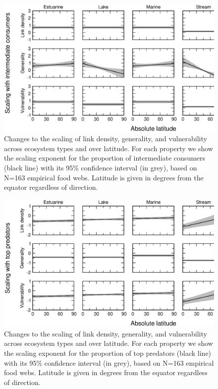 \documentclass[12pt]{article}
\begin{document}
\newpage


\begin{figure}[h]
\centerline{\includegraphics*[width=.8\textwidth]{Figures/by_TL/marginal/I_marginal_latitude_proportions.eps}}
\caption{Changes to the scaling of link density, generality, and vulnerability across ecosystem
types and over latitude. For each property we show the scaling exponent for the proportion of
intermediate consumers (black line) with its 95\% confidence interval (in grey), based on 
N=163 empirical food webs. Latitude is given in degrees
from the equator regardless of direction.}
\label{I}
\end{figure}

\begin{figure}[!h]
\centerline{\includegraphics*[width=.8\textwidth]{Figures/by_TL/marginal/T_marginal_latitude_proportions.eps}}
\caption{Changes to the scaling of link density, generality, and vulnerability across ecosystem
types and over latitude. For each property we show the scaling exponent for the proportion of
top predators (black line) with its 95\% confidence interval (in grey), based on N=163 
empirical food webs. Latitude is given in degrees
from the equator regardless of direction.}
\label{T}
\end{figure}


\newpage


\end{document}
